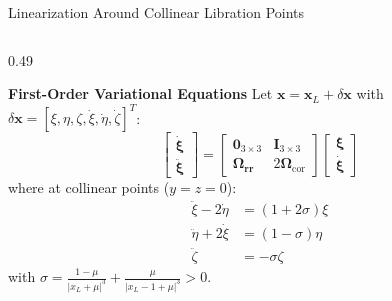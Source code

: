 \documentclass[aspectratio=169, 10pt]{beamer}
\begin{document}
\begin{frame}{Linearization Around Collinear Libration Points}
    \begin{columns}[t]
        \begin{column}{0.49\textwidth}
            \begin{block}{\textbf{First-Order Variational Equations}}
                \scriptsize
                Let $\mathbf{x} = \mathbf{x}_{L} + \delta\mathbf{x}$ with $\delta\mathbf{x} = [\xi, \eta, \zeta, \dot{\xi}, \dot{\eta}, \dot{\zeta}]^T$:
                \begin{equation*}
                    \begin{bmatrix} \dot{\bm{\xi}} \\ \ddot{\bm{\xi}} \end{bmatrix} =
                    \begin{bmatrix}
                        \mathbf{0}_{3\times 3} & \mathbf{I}_{3\times 3} \\
                        \bm{\Omega}_{\mathbf{r}\mathbf{r}} & 2\bm{\Omega}_{\text{cor}}
                    \end{bmatrix}
                    \begin{bmatrix} \bm{\xi} \\ \dot{\bm{\xi}} \end{bmatrix}
                \end{equation*}
                where at collinear points ($y = z = 0$):
                \begin{align*}
                    \ddot{\xi} - 2\dot{\eta} &= (1 + 2\sigma)\xi \\
                    \ddot{\eta} + 2\dot{\xi} &= (1 - \sigma)\eta \\
                    \ddot{\zeta} &= -\sigma\zeta
                \end{align*}
                with $\sigma = \frac{1-\mu}{|x_L + \mu|^3} + \frac{\mu}{|x_L - 1 + \mu|^3} > 0$.
            \end{block}
        \end{column}
        

\end{columns}
\end{frame}
\end{document}
